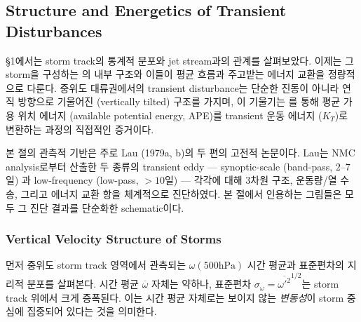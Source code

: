 
\subsection{Structure and Energetics of Transient Disturbances}

\S1에서는 storm track의 통계적 분포와 jet stream과의 관계를 살펴보았다.
이제는 그 storm을 구성하는 의 내부 구조와
이들이 평균 흐름과 주고받는 에너지 교환을 정량적으로 다룬다.
중위도 대류권에서의 transient disturbance는 단순한 진동이 아니라
연직 방향으로 기울어진 (vertically tilted) 구조를 가지며,
이 기울기는 를 통해 평균 가용 위치 에너지
(available potential energy, APE)를 transient 운동 에너지 ($K_T$)로
변환하는 과정의 직접적인 증거이다.


본 절의 관측적 기반은 주로 Lau (1979a, b)의 두 편의 고전적 논문이다.
Lau는 NMC analysis로부터 산출한 두 종류의 transient eddy ---
synoptic-scale (band-pass, $2$--$7$일) 과 low-frequency
(low-pass, $> 10$일) --- 각각에 대해 3차원 구조, 운동량/열 수송,
그리고 에너지 교환 항을 체계적으로 진단하였다.
본 절에서 인용하는 그림들은 모두 그 진단 결과를 단순화한 schematic이다.


\subsubsection{Vertical Velocity Structure of Storms}

먼저 중위도 storm track 영역에서 관측되는 $\omega(500\text{hPa})$
시간 평균과 표준편차의 지리적 분포를 살펴본다.
시간 평균 $\overline{\omega}$ 자체는 약하나, 표준편차
$\sigma_\omega = \overline{\omega'^2}^{1/2}$는 storm track 위에서 크게 증폭된다.
이는 시간 평균 자체로는 보이지 않는 \textit{변동성}이 storm 중심에
집중되어 있다는 것을 의미한다.

